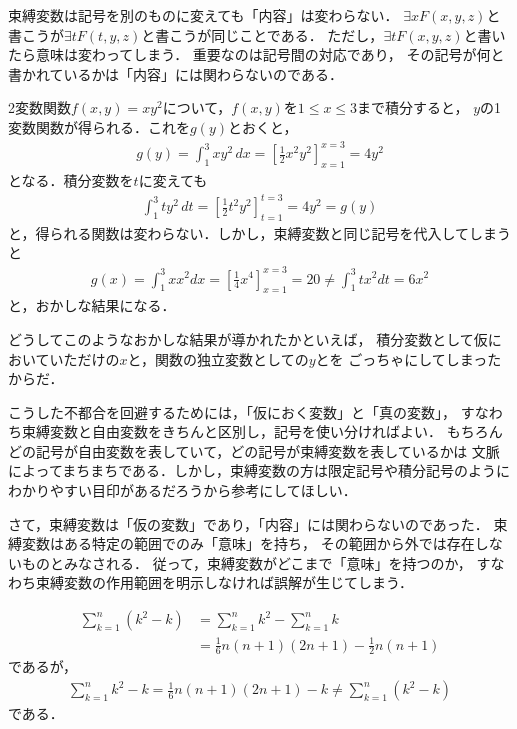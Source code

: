  束縛変数は記号を別のものに変えても「内容」は変わらない．
 $\exists x F(x,y,z)$と書こうが$\exists t F(t,y,z)$と書こうが同じことである．
 ただし，$\exists t F(x, y,z)$と書いたら意味は変わってしまう．
 重要なのは記号間の対応であり，
 その記号が何と書かれているかは「内容」には関わらないのである．

 \begin{ex}
   2変数関数$f(x,y)=xy^2$について，$f(x,y)$を$1 \leq x \leq 3$まで積分すると，
   $y$の1変数関数が得られる．これを$g(y)$とおくと，
   \begin{align*}
     g(y) = \int_1^3 xy^2 \, dx = \left[ \frac{1}{2} x^2y^2 
     \right]_{x=1}^{x=3} = 4y^2
   \end{align*}
   となる．積分変数を$t$に変えても
   \begin{align*}
     \int_{1}^3 t y^2 \, dt = \left[ \frac{1}{2} t^2 y^2
     \right]_{t=1}^{t=3} = 4y^2 =g(y)
   \end{align*}
   と，得られる関数は変わらない．しかし，束縛変数と同じ記号を代入してしまうと
   \begin{align*}
     g(x) = \int_1^3 x x^2 dx = \left[ \frac{1}{4} x^4 
     \right]_{x=1}^{x=3} = 20 \neq \int_1^3 t x^2 dt = 6x^2
   \end{align*}
   と，おかしな結果になる．
 \end{ex}

 どうしてこのようなおかしな結果が導かれたかといえば，
 積分変数として仮においていただけの$x$と，関数の独立変数としての$y$とを
 ごっちゃにしてしまったからだ．

 こうした不都合を回避するためには，「仮におく変数」と「真の変数」，
 すなわち束縛変数と自由変数をきちんと区別し，記号を使い分ければよい．
 もちろんどの記号が自由変数を表していて，どの記号が束縛変数を表しているかは
 文脈によってまちまちである．しかし，束縛変数の方は限定記号や積分記号のように
 わかりやすい目印があるだろうから参考にしてほしい．

 さて，束縛変数は「仮の変数」であり，「内容」には関わらないのであった．
 束縛変数はある特定の範囲でのみ「意味」を持ち，
 その範囲から外では存在しないものとみなされる．
 従って，束縛変数がどこまで「意味」を持つのか，
 すなわち束縛変数の作用範囲を明示しなければ誤解が生じてしまう．

 \begin{ex}
   \begin{align*}
     \sum_{k=1}^{n} ( k^2 - k) & = \sum_{k=1}^{n} k^2 - \sum_{k=1}^{n} k \\
     & = \frac{1}{6} n(n+1)(2n+1) - \frac{1}{2} n(n+1)
   \end{align*}
   であるが，
   \begin{align*}
     \sum_{k=1}^{n} k^2 - k = \frac{1}{6} n (n+1)(2n+1) - k 
     \neq \sum_{k=1}^{n} ( k^2 -k)
   \end{align*}
   である．
 \end{ex}
 
